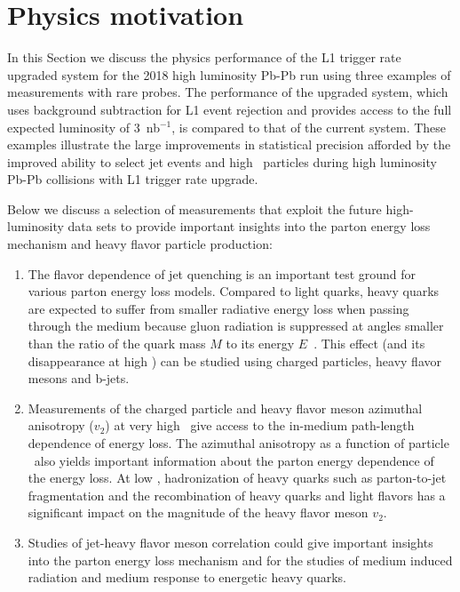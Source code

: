 \section{Physics motivation\label{sec:physHI}}
\label{sec:physics}

In this Section we discuss the physics performance of the L1 trigger rate upgraded system for the 2018 high luminosity Pb-Pb run using three examples of measurements with rare probes. The performance of the upgraded system, which uses background subtraction for L1 event rejection and provides access to the full expected luminosity of 3~nb$^{-1}$, is compared to that of the current system. These examples illustrate the large improvements in statistical precision afforded by the improved ability to select jet events and high \pt\ particles during high luminosity Pb-Pb collisions with L1 trigger rate upgrade. 

Below we discuss a selection of measurements that exploit the future high-luminosity data sets to provide important insights into the parton energy loss mechanism and heavy flavor particle production:

\begin{enumerate}
\item The flavor dependence of jet quenching is an important test ground for various parton energy loss models. 
Compared to light quarks, heavy quarks are expected to suffer from smaller radiative energy loss when passing through the medium because gluon radiation is suppressed at angles smaller than the ratio of the quark mass $M$ to its energy $E$~\cite{Dokshitzer:2001zm}. This effect (and its disappearance at high \pt) can be studied using charged particles, heavy flavor mesons and b-jets.
\item Measurements of the charged particle and heavy flavor meson azimuthal anisotropy ($v_2$) at very high \pt\ give access to the in-medium path-length 
dependence of energy loss. The azimuthal anisotropy as a function of particle \pt\ also yields important information about the parton energy dependence of the energy loss.  At low \pt, hadronization of heavy quarks such as parton-to-jet fragmentation and the recombination of heavy quarks and light flavors has a significant impact on the magnitude of the heavy flavor meson $v_2$. 
\item Studies of jet-heavy flavor meson correlation could give important insights into the parton energy loss mechanism and for the studies of medium induced radiation and medium response to energetic heavy quarks.
\end{enumerate}

